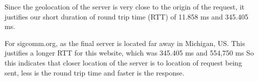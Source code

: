 \documentclass{article}
\begin{document}
\noindent
Since the geolocation of the server is very close to the origin of the request, it justifies our short duration of round trip time (RTT) of 11.858 ms and 345.405 ms.

\noindent
For sigcomm.org, as the final server is located far away in Michigan, US. This justifies a longer RTT for this website, which was 345.405 ms and 554,750 ms So this indicates that closer location of the server is to location of request being sent, less is the round trip time and faster is the response.

\end{document}
